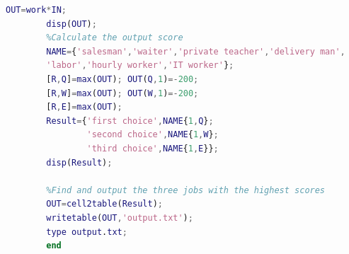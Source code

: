 \documentclass[12pt]{article}
\begin{document}
\begin{appendix}
\begin{lstlisting}[language=Matlab]
        OUT=work*IN;
        disp(OUT);
        %Calculate the output score
        NAME={'salesman','waiter','private teacher','delivery man',
        'labor','hourly worker','IT worker'};
        [R,Q]=max(OUT); OUT(Q,1)=-200;
        [R,W]=max(OUT); OUT(W,1)=-200;
        [R,E]=max(OUT);
        Result={'first choice',NAME{1,Q};
                'second choice',NAME{1,W};
                'third choice',NAME{1,E}};
        disp(Result);

        %Find and output the three jobs with the highest scores
        OUT=cell2table(Result);
        writetable(OUT,'output.txt');
        type output.txt;
        end
    \end{lstlisting}
\end{appendix}

\end{document}
